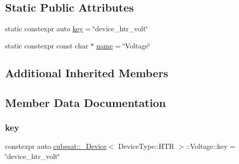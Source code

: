 \subsection*{Static Public Attributes}
\begin{DoxyCompactItemize}
\item 
static constexpr auto \hyperlink{structcubesat_1_1__Device_3_01DeviceType_1_1HTR_01_4_1_1Voltage_a4d838a70671378f75699a60f19b5177b}{key} = \char`\"{}device\+\_\+htr\+\_\+volt\char`\"{}
\item 
static constexpr const char $\ast$ \hyperlink{structcubesat_1_1__Device_3_01DeviceType_1_1HTR_01_4_1_1Voltage_aaa4b3e3d41025e381084f1808a8cc6e7}{name} = \char`\"{}Voltage\char`\"{}
\end{DoxyCompactItemize}
\subsection*{Additional Inherited Members}


\subsection{Member Data Documentation}
\mbox{\label{structcubesat_1_1__Device_3_01DeviceType_1_1HTR_01_4_1_1Voltage_a4d838a70671378f75699a60f19b5177b}} 
\subsubsection{\texorpdfstring{key}{key}}
{\footnotesize\ttfamily constexpr auto \hyperlink{structcubesat_1_1__Device}{cubesat\+::\+\_\+\+Device}$<$ Device\+Type\+::\+H\+TR $>$\+::Voltage\+::key = \char`\"{}device\+\_\+htr\+\_\+volt\char`\"{}\hspace{0.3cm}{\ttfamily [static]}}

\mbox{\label{structcubesat_1_1__Device_3_01DeviceType_1_1HTR_01_4_1_1Voltage_aaa4b3e3d41025e381084f1808a8cc6e7}} 
